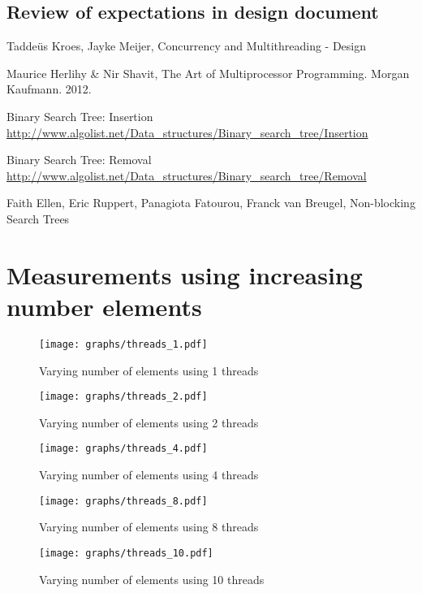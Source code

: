 \documentclass[a4paper]{article}
\begin{document}


\subsection{Review of expectations in design document}

\begin{thebibliography}{}
    Taddeüs Kroes, Jayke Meijer, Concurrency and Multithreading - Design

    Maurice Herlihy \& Nir Shavit, The Art of Multiprocessor Programming. Morgan Kaufmann.
    2012.

    Binary Search Tree: Insertion
    \url{http://www.algolist.net/Data_structures/Binary_search_tree/Insertion}

    Binary Search Tree: Removal
    \url{http://www.algolist.net/Data_structures/Binary_search_tree/Removal}

    Faith Ellen, Eric Ruppert, Panagiota Fatourou, Franck van Breugel, Non-blocking Search
    Trees

\appendix
\section{Measurements using increasing number elements}
\label{app:vary_nelements}

\begin{figure}[H]
    \texttt{[image: graphs/threads\_1.pdf]}
    \caption{Varying number of elements using 1 threads}
    \label{fig:threads_1}
\end{figure}
\begin{figure}[H]
    \texttt{[image: graphs/threads\_2.pdf]}
    \caption{Varying number of elements using 2 threads}
    \label{fig:threads_2}
\end{figure}
\begin{figure}[H]
    \texttt{[image: graphs/threads\_4.pdf]}
    \caption{Varying number of elements using 4 threads}
    \label{fig:threads_4}
\end{figure}
\begin{figure}[H]
    \texttt{[image: graphs/threads\_8.pdf]}
    \caption{Varying number of elements using 8 threads}
    \label{fig:threads_8}
\end{figure}
\begin{figure}[H]
    \texttt{[image: graphs/threads\_10.pdf]}
    \caption{Varying number of elements using 10 threads}
    \label{fig:threads_10}
\end{figure}


\end{thebibliography}
\end{document}
